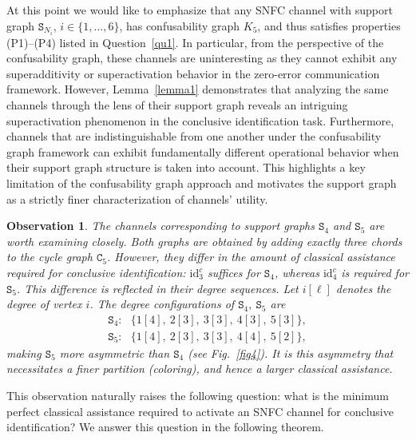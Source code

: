 \documentclass[12pt,a4paper]{article}
\newtheorem{observation}{Observation}
\begin{document}
\noindent At this point we would like to emphasize that any SNFC channel with support graph $\mathtt{S}_{N_i}$, $i \in \{1, \ldots, 6\}$, has confusability graph $K_5$, and thus satisfies properties (P1)--(P4) listed in Question~\ref{qu1}. In particular, from the perspective of the confusability graph, these channels are uninteresting as they cannot exhibit any superadditivity or superactivation behavior in the zero-error communication framework. However, Lemma~\ref{lemma1} demonstrates that analyzing the same channels through the lens of their support graph reveals an intriguing superactivation phenomenon in the conclusive identification task. Furthermore, channels that are indistinguishable from one another under the confusability graph framework can exhibit fundamentally different operational behavior when their support graph structure is taken into account. This highlights a key limitation of the confusability graph approach and motivates the support graph as a strictly finer characterization of channels' utility.   


\begin{observation}\label{obs3}
The channels corresponding to support graphs $\mathtt{S}_4$ and $\mathtt{S}_5$ are worth examining closely. Both graphs are obtained by adding exactly three chords to the cycle graph $\mathtt{C}_5$. However, they differ in the amount of classical assistance required for conclusive identification: $\mathrm{id}^c_3$ suffices for $\mathtt{S}_4$, whereas $\mathrm{id}^c_4$ is required for $\mathtt{S}_5$. This difference is reflected in their degree sequences. Let $i[\ell]$ denotes the degree of vertex $i$. The degree configurations of $\mathtt{S}_4,~\mathtt{S}_5$ are
\begin{subequations}
\begin{align}
\mathtt{S}_4:~~~\big\{1[4],\ 2[3],\ 3[3],\ 4[3],\ 5[3]\big\},\\  
\mathtt{S}_5:~~~\big\{1[4],\ 2[3],\ 3[3],\ 4[4],\ 5[2]\big\},
\end{align}    
\end{subequations}
making $\mathtt{S}_5$ more asymmetric than $\mathtt{S}_4$ (see Fig.~\ref{fig4}). It is this asymmetry that necessitates a finer partition (coloring), and hence a larger classical assistance.
\end{observation}

\noindent This observation naturally raises the following question: what is the minimum perfect classical assistance required to activate an SNFC channel for conclusive identification? We answer this question in the following theorem.
\end{document}
